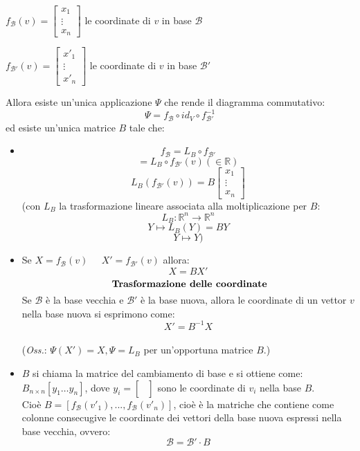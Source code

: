 $f_{\mathcal{B}}(v)=\begin{bmatrix}x_1\\\vdots\\x_n\end{bmatrix}$ le coordinate di $v$ in base $\mathcal{B}$

$f_{\mathcal{B}'}(v)=\begin{bmatrix}x'_1\\\vdots\\x'_n\end{bmatrix}$ le coordinate di $v$ in base $\mathcal{B}'$

Allora esiste un'unica applicazione $\Psi$ che rende il diagramma commutativo:
\[\Psi=f_{\mathcal{B}}\circ id_V \circ f_{\mathcal{B}'}^{-1}\]
ed esiste un'unica matrice $B$ tale che:
\begin{itemize}
\item \[f_{\mathcal{B}}=L_B \circ f_{\mathcal{B}'}\]
  \[=L_B\circ f_{\mathcal{B}'}(v) (\in\mathbb{R})\]
  \[L_B(f_{\mathcal{B}'}(v))=B\begin{bmatrix}x_1\\\vdots\\x_n\end{bmatrix}\]
  (con $L_B$ la trasformazione lineare associata alla moltiplicazione per $B$:
  \[L_B: \mathbb{R}^n\rightarrow\mathbb{R}^n\]
  \[Y\mapsto L_B(Y)=BY\]
  \[Y\mapsto Y)\]

\item Se $X=f_{\mathcal{B}}(v)\;\;\;\;\;X'=f_{\mathcal{B}'}(v)$ allora:
  \[X=BX'\]\[\text{ \textbf{Trasformazione delle coordinate}}\]
  Se $\mathcal{B}$ è la base vecchia e $\mathcal{B}'$ è la base nuova, allora le coordinate di un vettor $v$ nella base nuova si esprimono come:
  \[X'=B^{-1}X\]
  \\(\textit{Oss.}: $\Psi(X')=X, \Psi=L_B$ per un'opportuna matrice $B$.)

\item $B$ si chiama la matrice del cambiamento di base e si ottiene come:
  $B_{n\times n}[y_1\dots y_n]$, dove $y_i=\begin{bmatrix}\\ \\ \\\end{bmatrix}$ sono le coordinate di $v_i$ nella base $B$.
  \\Cioè $B=[f_{\mathcal{B}}(v'_1),...,f_{\mathcal{B}}(v'_n)]$, cioè è la matriche che contiene come colonne consecugive le coordinate dei vettori della base nuova espressi nella base vecchia, ovvero:
  \[\mathcal{B}=\mathcal{B}'\cdot B\]


\end{itemize}
